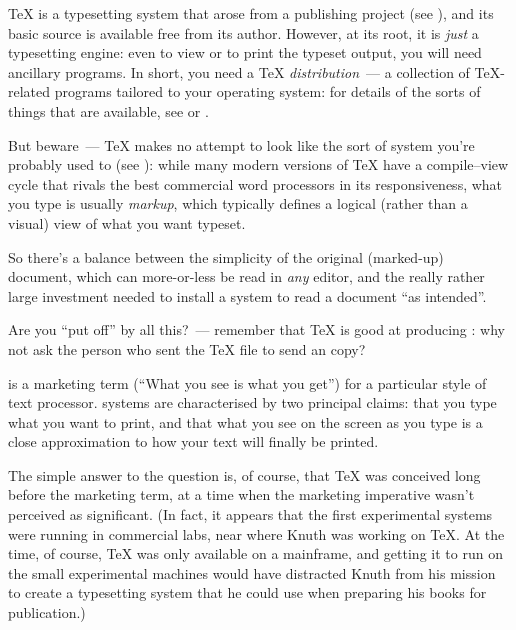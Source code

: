\TeX{} is a typesetting system that arose from a publishing project (see
),
and its basic source is available free from its author.  However, at
its root, it is \emph{just} a typesetting engine: even to view or to
print the typeset output, you will need ancillary programs.  In short,
you need a \TeX{} \emph{distribution}~--- a collection of
\TeX{}-related programs tailored to your operating system: for details
of the sorts of things that are available, see
or
.

But beware~--- \TeX{} makes no attempt to look like the sort of
\WYSIWYG{} system you're probably used to (see
):
while many modern versions of \TeX{} have a compile--view cycle that
rivals the best commercial word processors in its responsiveness, what
you type is usually \emph{markup}, which typically defines a logical
(rather than a visual) view of what you want typeset.

So there's a balance between the simplicity of the original
(marked-up) document, which can more-or-less be read in \emph{any}
editor, and the really rather large investment needed to install a
system to read a document ``as intended''.

Are you ``put off'' by all this?~--- remember that \TeX{} is good at
producing : why not ask the person who sent the \TeX{} file
to send an  copy?


\WYSIWYG{} is a marketing term (``What you see is what you get'') for
a particular style of text processor.  \WYSIWYG{} systems are
characterised by two principal claims: that you type what you want to
print, and that what you see on the screen as you type is a close
approximation to how your text will finally be printed.

The simple answer to the question is, of course, that \TeX{} was
conceived long before the marketing term, at a time when the marketing
imperative wasn't perceived as significant.  (In fact, it appears that
the first experimental \WYSIWYG{} systems were running in commercial
labs, near where Knuth was working on \TeX{}.  At the time, of course,
\TeX{} was only available on a mainframe, and getting it to run on the
small experimental machines would have distracted Knuth from his
mission to create a typesetting system that he could use when
preparing his books for publication.)

